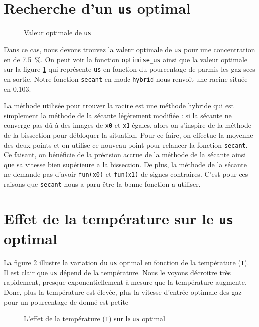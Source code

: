 \documentclass[11pt]{report}
\begin{document}
        \section{Recherche d'un \texttt{us} optimal}
            \begin{figure}[ht]
                \centering
                
                \caption{Valeur optimale de \texttt{us}}
                \label{graph:us}
            \end{figure}
            Dans ce cas, nous devons trouvez la valeur optimale de \verb|us| pour une concentration
            en  de \SI{7.5}{\percent}.
            On peut voir la fonction \verb|optimise_us| ainsi que la valeur optimale sur la figure \ref{graph:us}
            qui représente \verb|us| en fonction du pourcentage de  parmis les gaz secs en sortie.
            Notre fonction \verb|secant| en mode \verb|hybrid| nous renvoit une racine située en 0.103.
            \par
            La méthode utilisée pour trouver la racine est une méthode hybride qui est simplement
            la méthode de la sécante légèrement modifiée : si la sécante ne converge pas dû à des
            images de \verb|x0| et \verb|x1| égales,
            alors on s'inspire de la méthode de la bissection pour  débloquer la situation.
            Pour ce faire, on effectue la moyenne des deux points et on utilise ce nouveau point pour relancer
            la fonction \verb|secant|. Ce faisant, on bénéficie de la précision accrue de la méthode de la sécante
            ainsi que sa vitesse bien supérieure a la bissection. De plus, la méthode de la sécante ne demande 
            pas d'avoir \verb|fun(x0)| et \verb|fun(x1)| de signes contraires. C'est pour ces raisons que \verb|secant| nous a 
            paru être la bonne fonction a utiliser.
        \section{Effet de la température sur le \texttt{us} optimal}
            La figure \ref{graph:us/T} illustre la variation du \verb|us| optimal en fonction de la température (\verb|T|).
            Il est clair que \verb|us| dépend de la température. 
            Nous le voyons décroitre très rapidement, presque exponentiellement à mesure que la température augmente.
            Donc, plus la température est élevée, plus la vitesse d'entrée
            optimale des gaz pour un pourcentage de  donné est petite.
            \begin{figure}[ht]
                \centering
                
                \caption{L'effet de la température (\texttt{T}) sur le \texttt{us} optimal}
                \label{graph:us/T}
            \end{figure}
\end{document}
